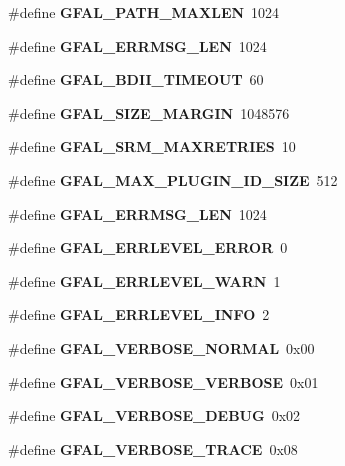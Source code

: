 \begin{CompactItemize}
\item 
\#define \textbf{GFAL\_\-PATH\_\-MAXLEN}~1024\label{gfal__constants_8h_d523fff3afa4c245c302d8001aea8f9c}

\item 
\#define \textbf{GFAL\_\-ERRMSG\_\-LEN}~1024\label{gfal__constants_8h_7b40fd79ddf31bad610f516475065a0e}

\item 
\#define \textbf{GFAL\_\-BDII\_\-TIMEOUT}~60\label{gfal__constants_8h_d06bbf92499b345ee7305317ec5c1c1b}

\item 
\#define \textbf{GFAL\_\-SIZE\_\-MARGIN}~1048576\label{gfal__constants_8h_8bebe3d274d63f517a5e875a0588cc62}

\item 
\#define \textbf{GFAL\_\-SRM\_\-MAXRETRIES}~10\label{gfal__constants_8h_65a6aeea7aa08fb785c08770e993137b}

\item 
\#define \textbf{GFAL\_\-MAX\_\-PLUGIN\_\-ID\_\-SIZE}~512\label{gfal__constants_8h_f450a268274116d7f0d21461cd3e8df9}

\item 
\#define \textbf{GFAL\_\-ERRMSG\_\-LEN}~1024\label{gfal__constants_8h_7b40fd79ddf31bad610f516475065a0e}

\item 
\#define \textbf{GFAL\_\-ERRLEVEL\_\-ERROR}~0\label{gfal__constants_8h_6426c0ea17e86ab60e58f0736752880f}

\item 
\#define \textbf{GFAL\_\-ERRLEVEL\_\-WARN}~1\label{gfal__constants_8h_dc3471997c4f262015c3720a605ded41}

\item 
\#define \textbf{GFAL\_\-ERRLEVEL\_\-INFO}~2\label{gfal__constants_8h_7e72d1391c92eee828752e1e6b8102a2}

\item 
\#define \textbf{GFAL\_\-VERBOSE\_\-NORMAL}~0x00\label{gfal__constants_8h_3c3ece79804284cc6966b7773e1db120}

\item 
\#define \textbf{GFAL\_\-VERBOSE\_\-VERBOSE}~0x01\label{gfal__constants_8h_84a32c8a5edeea3b4f38de04ded0969f}

\item 
\#define \textbf{GFAL\_\-VERBOSE\_\-DEBUG}~0x02\label{gfal__constants_8h_bb3df1c6c5b916095e8310fe969e5d67}

\item 
\#define \textbf{GFAL\_\-VERBOSE\_\-TRACE}~0x08\label{gfal__constants_8h_62b3e4b92c6df96f9b0e2dc961dabd5a}


\end{CompactItemize}
